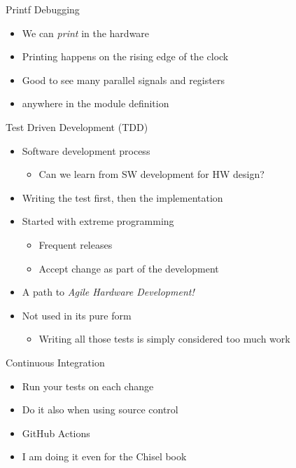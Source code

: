\begin{frame}[fragile]{Printf Debugging}
\begin{itemize}
\item We can \emph{print} in the hardware
\item Printing happens on the rising edge of the clock
\item Good to see many parallel signals and registers
\item {} anywhere in the module definition
\end{itemize}
\end{frame}


\begin{frame}[fragile]{Test Driven Development (TDD)}
\begin{itemize}
\item Software development process
\begin{itemize}
\item Can we learn from SW development for HW design?
\end{itemize}
\item Writing the test first, then the implementation
\item Started with extreme programming
\begin{itemize}
\item Frequent releases
\item Accept change as part of the development
\end{itemize}
\item A path to \emph{Agile Hardware Development!}
\item Not used in its pure form
\begin{itemize}
\item Writing all those tests is simply considered too much work
\end{itemize}
\end{itemize}
\end{frame}

\begin{frame}[fragile]{Continuous Integration}
\begin{itemize}
\item Run your tests on each change
\item Do it also when using source control
\item GitHub Actions
\item I am doing it even for the Chisel book
\end{itemize}
\end{frame}

